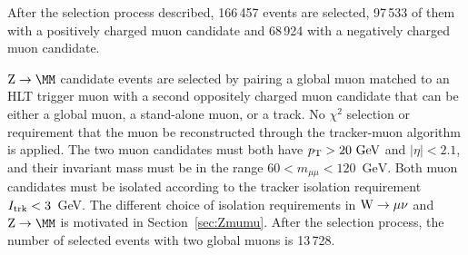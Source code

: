 

After the selection process described, 166\,457 events are selected,
97\,533 of them with a positively charged muon candidate and 68\,924 with a negatively
charged muon candidate.

$\Zmm$ candidate events are selected by pairing a global muon matched to an HLT trigger muon with a second
oppositely charged muon candidate that can be either a global muon, a stand-alone muon, or a track. 
No $\chi^2$ selection or requirement that the muon be reconstructed 
through the tracker-muon algorithm is applied. 
The two muon candidates must both have $p_{\mathrm{T}} > 20~\mathrm{GeV}$ and $|\eta| < 2.1$,
and their invariant mass must be in the range $60<m_{\mu\mu}<120$~$\mathrm{GeV}$.
Both muon candidates must be isolated according to the tracker isolation requirement $I_{\textrm{trk}}<3$~GeV.
The different choice of isolation requirements in $\mathrm{W} \rightarrow \mu\nu$ and $\Zmm$ is
motivated in Section~\ref{sec:Zmumu}.
After the selection process, the number of selected events with two
global muons is 13\,728.
